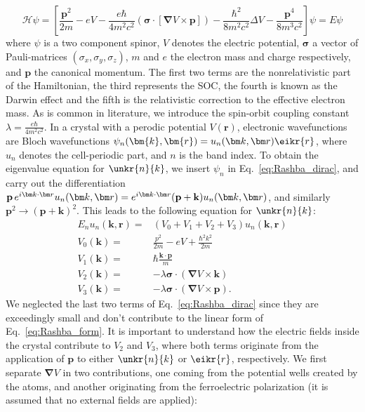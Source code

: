 \begin{equation}
	\label{eq:Rashba_dirac}
	\mathcal{H} \psi = \left[\frac{\bm{p}^2}{2m} - e V - \frac{e \hbar}{4m^2c^2}(\bm{\sigma}\cdot[\bm{\nabla}V \times \bm{p}]) - \frac{\hbar^2}{8m^2c^2} \Delta V - \frac{\bm{p}^4}{8m^3c^2}\right]\psi = E\psi
\end{equation}
where $\psi$ is a two component spinor, $V$ denotes the electric potential, $\bm{\sigma}$ a vector of Pauli-matrices $(\sigma_x, \sigma_y, \sigma_z)$, $m$ and $e$ the electron mass and charge respectively, and $\bm{p}$ the canonical momentum. The first two terms are the nonrelativistic part of the Hamiltonian, the third represents the SOC, the fourth is known as the Darwin effect and the fifth is the relativistic correction to the effective electron mass. 
As is common in literature, we introduce the spin-orbit coupling constant $\lambda = \frac{e \hbar}{4m^2c^2}$.
In a crystal with a perodic potential $V(\mathbf{r})$, electronic wavefunctions are Bloch wavefunctions $\psi_n(\bm{k}, \bm{r}) = \Unkr \eikr{r}$, where $u_n$ denotes the cell-periodic part, and $n$ is the band index.
To obtain the eigenvalue equation for $\unkr{n}{k}$, we insert $\psi_n$ in Eq.~\ref{eq:Rashba_dirac}, and carry out the differentiation $\mathbf{p} \, \Eikr\Unkr = \Eikr(\mathbf{p} + \mathbf{k})\Unkr$, and similarly $\mathbf{p}^2 \rightarrow (\mathbf{p}+\mathbf{k})^2$. This leads to the following equation for $\unkr{n}{k}$:
\begin{align}
	\label{eq:Rashba_unk_Vs}
	E_n u_n(\bm{k}, \bm{r}) =& \left(V_0 + V_1  +  V_2 + V_3 \right) u_n(\bm{k}, \bm{r}) \\
	V_0(\bm{k}) =& \frac{p^2}{2m} - eV + \frac{\hbar^2 k^2}{2m} \\
	V_1(\bm{k}) =& \hbar\frac{\bm{k}\cdot\bm{p}}{m} \\
	V_2(\bm{k}) =& -\lambda \bm{\sigma} \cdot ( \bm{\nabla}V \times \bm{k}) \\
	V_3(\bm{k}) =& -\lambda \bm{\sigma} \cdot ( \bm{\nabla}V \times \bm{p}).
\end{align}
We neglected the last two terms of Eq.~\ref{eq:Rashba_dirac} since they are exceedingly small and don't contribute to the linear form of Eq.~\ref{eq:Rashba_form}.
It is important to understand how the electric fields inside the crystal contribute to $V_2$ and $V_3$, where both terms originate from the application of $\bm{p}$ to either $\unkr{n}{k}$ or $\eikr{r}$, respectively.
We first separate $\bm{\nabla}V$ in two contributions, one coming from the potential wells created by the atoms, and another originating from the ferroelectric polarization (it is assumed that no external fields are applied):
